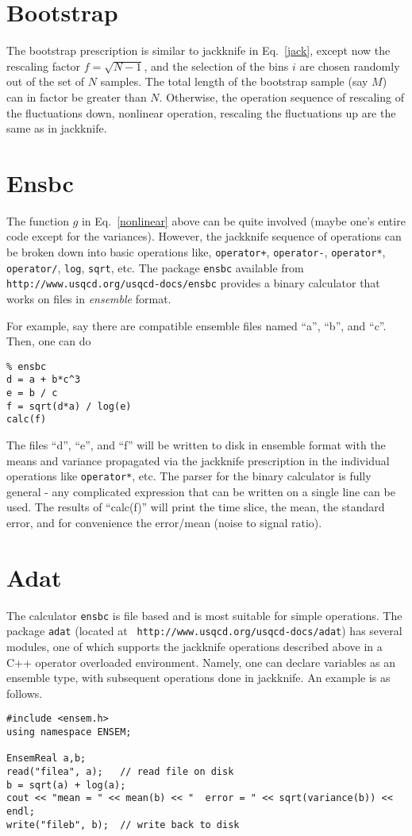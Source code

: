 \documentclass[12pt]{article}
\begin{document}
\section{Bootstrap}

The bootstrap prescription is similar to jackknife in Eq.~\ref{jack},
except now the rescaling factor $f=\sqrt{N-1}$, and the selection of
the bins $i$ are chosen randomly out of the set of $N$ samples. The
total length of the bootstrap sample (say $M$) can in factor be
greater than $N$.  Otherwise, the operation sequence of rescaling of
the fluctuations down, nonlinear operation, rescaling the fluctuations
up are the same as in jackknife.

\section{Ensbc}

The function $g$ in Eq.~\ref{nonlinear} above can be quite involved
(maybe one's entire code except for the variances). However, the
jackknife sequence of operations can be broken down into basic
operations like, {\tt operator+}, {\tt operator-}, {\tt operator*},
{\tt operator/}, {\tt log}, {\tt sqrt}, etc. The package {\tt ensbc}
available from {\tt http://www.usqcd.org/usqcd-docs/ensbc} provides
a binary calculator that works on files in {\em ensemble} format. 

For example, say there are compatible ensemble files named ``a'', ``b'',
and ``c''. Then, one can do
\begin{verbatim}
% ensbc
d = a + b*c^3
e = b / c
f = sqrt(d*a) / log(e)
calc(f)
\end{verbatim}
%
The files ``d'', ``e'', and ``f'' will be written to disk in ensemble format
with the means and variance propagated via the jackknife prescription in
the individual operations like {\tt operator*}, etc. The parser for the
binary calculator is fully general - any complicated expression that can
be written on a single line can be used. The results of ``calc(f)'' will print
the time slice, the mean, the standard error, and for convenience the error/mean
(noise to signal ratio).

\section{Adat}

The calculator {\tt ensbc} is file based and is most suitable for
simple operations. The package {\tt adat} (located at {\tt
http://www.usqcd.org/usqcd-docs/adat}) has several modules, one of
which supports the jackknife operations described above in a C++
operator overloaded environment.  Namely, one can declare variables as
an ensemble type, with subsequent operations done in jackknife. An example is
as follows.
\begin{verbatim}
#include <ensem.h>
using namespace ENSEM;

EnsemReal a,b;
read("filea", a);   // read file on disk
b = sqrt(a) + log(a);
cout << "mean = " << mean(b) << "  error = " << sqrt(variance(b)) << endl;
write("fileb", b);  // write back to disk
\end{verbatim}
\end{document}
